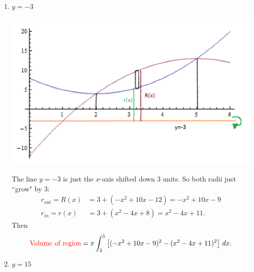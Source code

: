 \documentclass[noinstructornotes]{ximera}
\begin{document}
\begin{problem}
\begin{enumerate}
\begin{freeResponse}
	
		
		\end{freeResponse}
		
		
		
		\item  $y=-3$
		\begin{freeResponse}
		
				\begin{image}
		\includegraphics[scale=0.8]{Figure6-3-5new.png}
		\end{image}
		
		The line $y=-3$ is just the $x$-axis shifted down $3$ units.  
		So both radii just ``grow" by $3$:
			\begin{align*}
			r_{out} = R(x) &= 3 + (-x^2+10x-12) = -x^2 + 10x -9  \\
			r_{in} = r(x) &= 3 + (x^2-4x+8) = x^2 - 4x + 11.
			\end{align*}
		Then
			\[
			\text{{\color{red} Volume of region}} = \pi \int_2^5 \left[ (-x^2+10x-9)^2 - (x^2-4x+11)^2 \right] \,d x.
			\]
			

		\end{freeResponse}
		
		
		
		\item  $y=15$
		\begin{freeResponse}
		

\end{freeResponse}
\end{enumerate}
\end{problem}
\end{document}
